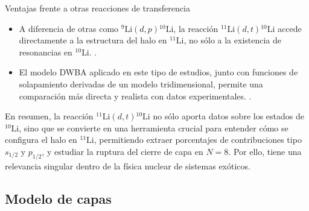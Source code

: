 Ventajas frente a otras reacciones de transferencia
\begin{itemize}
    \item A diferencia de otras como \({}^{9}\text{Li}(d,p){}^{10}\text{Li}\), la reacción \({}^{11}\text{Li}(d,t){}^{10}\text{Li}\) accede directamente a la estructura del halo en \({}^{11}\text{Li}\), no sólo a la existencia de resonancias en \({}^{10}\text{Li}\). \cite{CASAL2017307}. 
    
    \item El modelo DWBA aplicado en este tipo de estudios, junto con funciones de solapamiento derivadas de un modelo tridimensional, permite una comparación más directa y realista con datos experimentales. \cite{CASAL2017307}.
\end{itemize}


En resumen, la reacción \({}^{11}\text{Li}(d,t){}^{10}\text{Li}\) no sólo aporta datos sobre los estados de \({}^{10}\text{Li}\), sino que se convierte en una herramienta crucial para entender cómo se configura el halo en \({}^{11}\text{Li}\), permitiendo extraer porcentajes de contribuciones tipo \(s_{1/2}\) y \(p_{1/2}\), y estudiar la ruptura del cierre de capa en \(N=8\). Por ello, tiene una relevancia singular dentro de la física nuclear de sistemas exóticos.



\subsection{Modelo de capas}